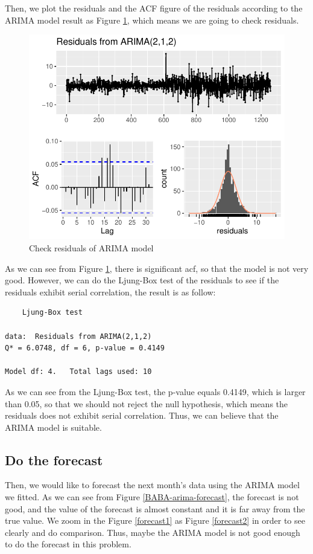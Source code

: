 \documentclass{article}
\begin{document}
Then, we plot the residuals and the ACF figure of the residuals according to the ARIMA model result as Figure \ref{BABA-arima-res}, which means we are going to check residuals.
\begin{figure}[htbp]
    \centering
    \includegraphics[width=0.7\linewidth]{images/BABA-arima-res}
    \caption{Check residuals of ARIMA model}
    \label{BABA-arima-res}
\end{figure}
As we can see from Figure \ref{BABA-arima-res}, there is significant acf, so that the model is not very good.  However, we can do the Ljung-Box test of the residuals to see if the residuals exhibit serial correlation, the result is as follow:
\begin{lstlisting}
	Ljung-Box test

data:  Residuals from ARIMA(2,1,2)
Q* = 6.0748, df = 6, p-value = 0.4149

Model df: 4.   Total lags used: 10
\end{lstlisting}
As we can see from the Ljung-Box test, the p-value equals 0.4149, which is larger than 0.05, so that we should not reject the null hypothesis, which means 
the residuals does not exhibit serial correlation. Thus, we can believe that the ARIMA model is suitable.
\vspace{4pt}
\subsection{Do the forecast}
Then, we would like to forecast the next month's data using the ARIMA model we fitted. As we can see from Figure \ref{BABA-arima-forecast}, the forecast is not 
good, and the value of the forecast is almost constant and it is far away from the true value. We zoom in the Figure \ref{forecast1} as Figure \ref{forecast2} in order to see clearly and do comparison.
Thus, maybe the ARIMA model is not good enough to do the forecast in this problem.
\end{document}
